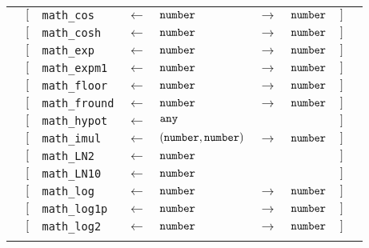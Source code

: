 \begin{tabular}[fragile]{lllllllll}
& $[$ & \texttt{math\_cos} & $\leftarrow$  & $\texttt{number}$ & $\rightarrow$ & $\texttt{number}$ & $]$ \\
& $[$ & \texttt{math\_cosh} & $\leftarrow$  & $\texttt{number}$ & $\rightarrow$ & $\texttt{number}$ & $]$ \\
& $[$ & \texttt{math\_exp} & $\leftarrow$  & $\texttt{number}$ & $\rightarrow$ & $\texttt{number}$ & $]$ \\
& $[$ & \texttt{math\_expm1} & $\leftarrow$  & $\texttt{number}$ & $\rightarrow$ & $\texttt{number}$ & $]$ \\
& $[$ & \texttt{math\_floor} & $\leftarrow$  & $\texttt{number}$ & $\rightarrow$ & $\texttt{number}$ & $]$ \\
& $[$ & \texttt{math\_fround} & $\leftarrow$  & $\texttt{number}$ & $\rightarrow$ & $\texttt{number}$ & $]$ \\
& $[$ & \texttt{math\_hypot} & $\leftarrow$  & $\texttt{any}$ & & & $]$ \\
& $[$ & \texttt{math\_imul} & $\leftarrow$  & $(\texttt{number}, \texttt{number})$ & $\rightarrow$ & $\texttt{number}$ & $]$ \\
& $[$ & \texttt{math\_LN2} & $\leftarrow$  & $\texttt{number}$ & & & $]$ \\
& $[$ & \texttt{math\_LN10} & $\leftarrow$  & $\texttt{number}$ & & & $]$ \\
& $[$ & \texttt{math\_log} & $\leftarrow$  & $\texttt{number}$ & $\rightarrow$ & $\texttt{number}$ & $]$ \\
& $[$ & \texttt{math\_log1p} & $\leftarrow$  & $\texttt{number}$ & $\rightarrow$ & $\texttt{number}$ & $]$ \\
& $[$ & \texttt{math\_log2} & $\leftarrow$  & $\texttt{number}$ & $\rightarrow$ & $\texttt{number}$ & $]$ \\
& \end{tabular}

